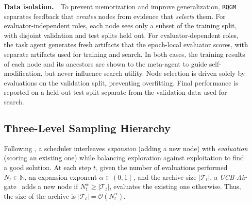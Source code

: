 \documentclass{paper}
\newcommand{\ourmethod}{\texttt{RQGM}\xspace}
\begin{document}

\noindent\textbf{Data isolation.}\label{sec:method:train}~~To prevent memorization and improve generalization, \ourmethod separates feedback that \emph{creates} nodes from evidence that \emph{selects} them. For evaluator-independent roles, each node sees only a subset of the training split, with disjoint validation and test splits held out. For evaluator-dependent roles, the task agent generates fresh artifacts that the epoch-local evaluator scores, with separate artifacts used for training and search. In both cases, the training results of each node and its ancestors are shown to the meta-agent to guide self-modification, but never influence search utility. Node selection is driven solely by evaluations on the validation split, preventing overfitting. Final performance is reported on a held-out test split separate from the validation data used for search.

\subsection{Three-Level Sampling Hierarchy}
\label{sec:method:hierarchy}

Following \citet{wang2025huxley}, a scheduler interleaves \emph{expansion} (adding a new node) with \emph{evaluation} (scoring an existing one) while balancing exploration against exploitation to find a good solution. At each step $t$, given the number of evaluations performed $N_t\in\mathbb{N}$, an expansion exponent $\alpha\in(0,1)$, and the archive size $|\mathcal{T}_t|$, a \emph{UCB-Air} gate~\citep{NIPS200849ae49a2} adds a new node if $N_t^{\alpha} \ge |\mathcal{T}_t|$, evaluates the existing one otherwise. Thus, the size of the archive is $|\mathcal{T}_t|=\mathcal{O}(N_t^{\alpha})$.
\end{document}

